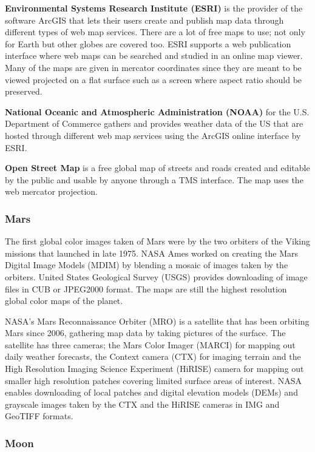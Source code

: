 \textbf{Environmental Systems Research Institute (ESRI)} is the provider of the software ArcGIS that lets their users create and publish map data through different types of web map services. There are a lot of free maps to use; not only for Earth but other globes are covered too. ESRI supports a web publication interface where web maps can be searched and studied in an online map viewer. Many of the maps are given in mercator coordinates since they are meant to be viewed projected on a flat surface such as a screen where aspect ratio should be preserved.

\textbf{National Oceanic and Atmospheric Administration (NOAA)} for the U.S. Department of Commerce gathers and provides weather data of the US that are hosted through different web map services using the ArcGIS online \cite{arcgis} interface by ESRI.

\textbf{Open Street Map} is a free global map of streets and roads created and editable by the public and usable by anyone through a TMS interface. The map uses the web mercator projection.

\subsubsection{Mars}

The first global color images taken of Mars were by the two orbiters of the Viking missions that launched in late 1975. NASA Ames worked on creating the Mars Digital Image Models (MDIM) by blending a mosaic of images taken by the orbiters. United States Geological Survey (USGS) provides downloading of image files in CUB or JPEG2000 format. The maps are still the highest resolution global color maps of the planet.

NASA's Mars Reconnaissance Orbiter (MRO) is a satellite that has been orbiting Mars since 2006, gathering map data by taking pictures of the surface. The satellite has three cameras; the Mars Color Imager (MARCI) for mapping out daily weather forecasts, the Context camera (CTX) for imaging terrain and the High Resolution Imaging Science Experiment (HiRISE) camera for mapping out smaller high resolution patches covering limited surface areas of interest. NASA enables downloading of local patches and digital elevation models (DEMs) and grayscale images taken by the CTX and the HiRISE cameras in IMG and GeoTIFF formats.

\subsubsection{Moon}

